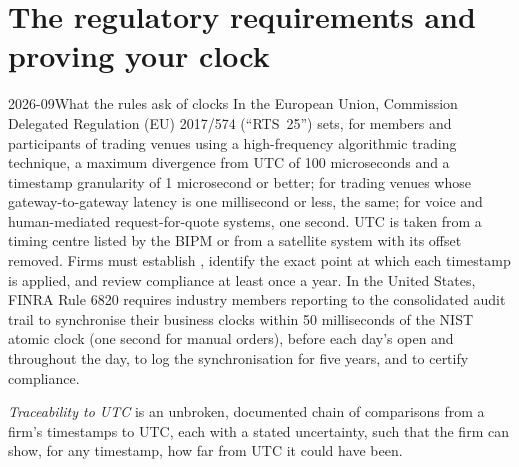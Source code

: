 \section{The regulatory requirements and proving your clock}

\begin{dated}{2026-09}{What the rules ask of clocks}\label{dat:nw:time-synchronisation:rules}
In the European Union, Commission Delegated Regulation (EU) 2017/574 (``RTS~25'') sets, for members and participants of trading venues
using a high-frequency algorithmic trading technique, a maximum divergence from UTC of 100 microseconds and a timestamp granularity of
1 microsecond or better; for trading venues whose gateway-to-gateway latency is one millisecond or less, the same; for voice and
human-mediated request-for-quote systems, one second. UTC is taken from a timing centre listed by the BIPM or from a satellite system
with its offset removed. Firms must establish , identify the exact point at which each timestamp is applied, and
review compliance at least once a year. In the United States, FINRA Rule 6820 requires industry members reporting to the consolidated
audit trail to synchronise their business clocks within 50 milliseconds of the NIST atomic clock (one second for manual orders),
before each day's open and throughout the day, to log the synchronisation for five years, and to certify compliance.
\end{dated}

\begin{definition}\label{def:nw:time-synchronisation:trace}
\emph{Traceability to UTC} is an unbroken, documented chain of comparisons from a firm's timestamps to UTC,
each with a stated uncertainty, such that the firm can show, for any timestamp, how far from UTC it could have been.
\end{definition}


